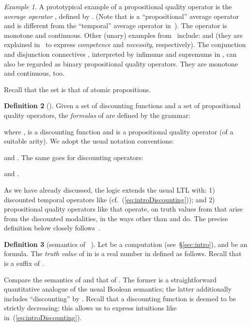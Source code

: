 \documentclass[a4paper,USenglish,numberwithinsect]{lipics}
\theoremstyle{definition}
\newtheorem{defi}{Definition}[section]
\theoremstyle{remark}
\newtheorem{exam}[defi]{Example}
\theoremstyle{plain}
\begin{document}
\begin{exam}\label{exam:propositionalQualityOperator}
 A prototypical example of a propositional quality operator is 
the \emph{average operator} , defined
 by . (Note that  is a
 ``propositional'' average operator and is different from the
 ``temporal'' average operator 
 in~\cite{BouyerMM14}). The operator  is monotone and
 continuous. 
 Other (unary) examples from~\cite{AlmagorBK13ExtendedPreprint} include: 
  and
  (they
 are explained in~\cite{AlmagorBK13ExtendedPreprint} to express \emph{competence} and \emph{necessity}, respectively).
 The conjunction and disjunction connectives , interpreted 
 by  infimums and supremums in , can also be regarded as binary
 propositional quality operators. They are  monotone and
 continuous, too. 
\end{exam}



Recall that the set   is that of atomic propositions. 
\begin{defi}[]\label{def:LTLdDSyntax}
Given a set  of discounting functions and a set  of propositional quality operators, the \emph{formulas} of 
are defined by the  grammar:
 
 where ,  is a discounting function and
  is a propositional quality operator (of a suitable arity). 
 We adopt the usual notation conventions: 

and 
. The same goes for discounting operators:

and 
.
\end{defi}
As we have already discussed, 
the logic  extends the usual LTL with: 1) discounted
temporal operators like  (cf.~(\ref{eq:introDiscounting}));
and 2) propositional quality operators like  that operate, on
 truth values from  that arise from the discounted modalities, in
 the ways other than  and  do. The  precise
 definition below
closely follows~\cite{AlmagorBK13,AlmagorBK14}.




\begin{defi}[semantics of ~\cite{AlmagorBK13,AlmagorBK14}]\label{def:LTLdDSemantics}
Let  be a computation (see~\S{}\ref{sec:intro}), and
  be an  formula.
 The \emph{truth value}  of  in 
 is a real number in  defined
as follows. Recall that  is a
 suffix of .

\end{defi}
Compare the semantics of 
and that of . The former is a
straightforward quantitative analogue of the usual Boolean semantics;
the latter additionally includes ``discounting'' by
. Recall that a discounting function  is
deemed to be strictly decreasing; this allows us to express intuitions
like in~(\ref{eq:introDiscounting}).
\end{document}
